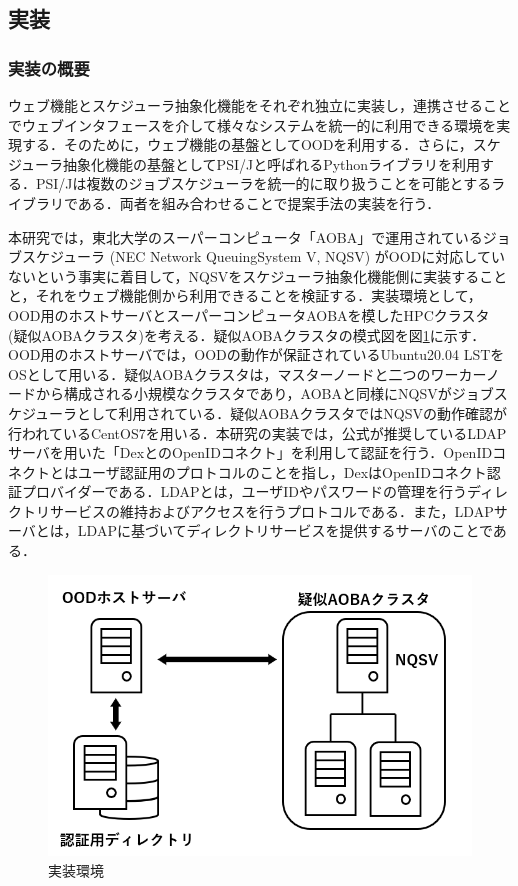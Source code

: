 \subsection{実装}
\subsubsection{実装の概要}
ウェブ機能とスケジューラ抽象化機能をそれぞれ独立に実装し，連携させることでウェブインタフェースを介して様々なシステムを統一的に利用できる環境を実現する．そのために，ウェブ機能の基盤としてOODを利用する．さらに，スケジューラ抽象化機能の基盤としてPSI/J\cite{cite5}と呼ばれるPythonライブラリを利用する．PSI/Jは複数のジョブスケジューラを統一的に取り扱うことを可能とするライブラリである．両者を組み合わせることで提案手法の実装を行う．\par
本研究では，東北大学のスーパーコンピュータ「AOBA」\cite{aoba}で運用されているジョブスケジューラ (NEC Network QueuingSystem V, NQSV) \cite{nqsv_scheduler}がOODに対応していないという事実に着目して，NQSVをスケジューラ抽象化機能側に実装することと，それをウェブ機能側から利用できることを検証する．実装環境として，OOD用のホストサーバとスーパーコンピュータAOBAを模したHPCクラスタ (疑似AOBAクラスタ)を考える．疑似AOBAクラスタの模式図を図\ref{fig7}に示す．OOD用のホストサーバでは，OODの動作が保証されているUbuntu20.04 LSTをOSとして用いる．疑似AOBAクラスタは，マスターノードと二つのワーカーノードから構成される小規模なクラスタであり，AOBAと同様にNQSVがジョブスケジューラとして利用されている．疑似AOBAクラスタではNQSVの動作確認が行われているCentOS7を用いる\cite{nqsv_introduction}．本研究の実装では，公式が推奨しているLDAPサーバを用いた「DexとのOpenIDコネクト」を利用して認証を行う\cite{cite7}\cite{cite8}．OpenIDコネクトとはユーザ認証用のプロトコルのことを指し，DexはOpenIDコネクト認証プロバイダーである．LDAPとは，ユーザIDやパスワードの管理を行うディレクトリサービスの維持およびアクセスを行うプロトコルである．また，LDAPサーバとは，LDAPに基づいてディレクトリサービスを提供するサーバのことである．\par

\begin{figure}[tb]
    \centering
    \includegraphics[width=120mm]{./fig/environment.png}
    \caption{実装環境}
    \label{fig7}
\end{figure}



